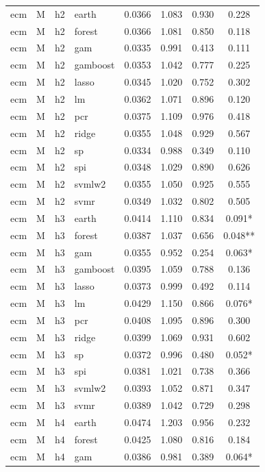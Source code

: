 \begin{ThreePartTable}
\begin{longtable}[t]{llclcccc}
\addlinespace
ecm & M & h2 & earth & 0.0366 & 1.083 & 0.930 & 0.228\\
ecm & M & h2 & forest & 0.0366 & 1.081 & 0.850 & 0.118\\
ecm & M & h2 & gam & 0.0335 & 0.991 & 0.413 & 0.111\\
ecm & M & h2 & gamboost & 0.0353 & 1.042 & 0.777 & 0.225\\
ecm & M & h2 & lasso & 0.0345 & 1.020 & 0.752 & 0.302\\
ecm & M & h2 & lm & 0.0362 & 1.071 & 0.896 & 0.120\\
ecm & M & h2 & pcr & 0.0375 & 1.109 & 0.976 & 0.418\\
ecm & M & h2 & ridge & 0.0355 & 1.048 & 0.929 & 0.567\\
ecm & M & h2 & sp & 0.0334 & 0.988 & 0.349 & 0.110\\
ecm & M & h2 & spi & 0.0348 & 1.029 & 0.890 & 0.626\\
ecm & M & h2 & svmlw2 & 0.0355 & 1.050 & 0.925 & 0.555\\
ecm & M & h2 & svmr & 0.0349 & 1.032 & 0.802 & 0.505\\
\addlinespace
ecm & M & h3 & earth & 0.0414 & 1.110 & 0.834 & 0.091*\\
ecm & M & h3 & forest & 0.0387 & 1.037 & 0.656 & 0.048**\\
ecm & M & h3 & gam & 0.0355 & 0.952 & 0.254 & 0.063*\\
ecm & M & h3 & gamboost & 0.0395 & 1.059 & 0.788 & 0.136\\
ecm & M & h3 & lasso & 0.0373 & 0.999 & 0.492 & 0.114\\
ecm & M & h3 & lm & 0.0429 & 1.150 & 0.866 & 0.076*\\
ecm & M & h3 & pcr & 0.0408 & 1.095 & 0.896 & 0.300\\
ecm & M & h3 & ridge & 0.0399 & 1.069 & 0.931 & 0.602\\
ecm & M & h3 & sp & 0.0372 & 0.996 & 0.480 & 0.052*\\
ecm & M & h3 & spi & 0.0381 & 1.021 & 0.738 & 0.366\\
ecm & M & h3 & svmlw2 & 0.0393 & 1.052 & 0.871 & 0.347\\
ecm & M & h3 & svmr & 0.0389 & 1.042 & 0.729 & 0.298\\
\addlinespace
ecm & M & h4 & earth & 0.0474 & 1.203 & 0.956 & 0.232\\
ecm & M & h4 & forest & 0.0425 & 1.080 & 0.816 & 0.184\\
ecm & M & h4 & gam & 0.0386 & 0.981 & 0.389 & 0.064*\\

\end{longtable}
\end{ThreePartTable}
